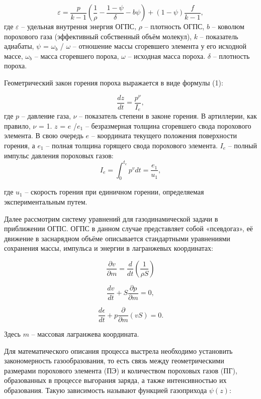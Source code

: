 \documentclass[14pt, a4paper]{report} %
\begin{document}
\begin{equation}
\varepsilon = \frac{p}{k - 1} \left( \frac{1}{\rho} - \frac{1 - \psi}{\delta} - b \psi \right) + (1 - \psi) \frac{f}{k - 1},
\label{eq:epsilon}
\end{equation}
где $\varepsilon$ -- удельная внутрення энергия ОГПС, $\rho$ -- плотность ОГПС, $b$ -- коволюм порохового газа (эффективный собственный объём молекул), $k$ -- показатель адиабаты, 
$\psi$ = $\omega_b$ / $\omega$ -- отношение массы сгоревшего элемента у его исходной массе, $\omega_b$ -- масса сгоревшего пороха, $\omega$ -- исходная масса пороха. $\delta$ -- плотность пороха. 

Геометрический закон горения пороха выражается в виде формулы (1): 

\begin{equation}
\frac{dz}{dt} = \frac{p^\nu}{I_e}, 
\label{eq:1}
\end{equation}
где  $p$ -- давление газа, $\nu$ -- показатель степени
в законе горения. В артиллерии, как правило, $\nu$ = 1. $z$ = $e$ /$e_1$ -- безразмерная толщина сгоревшего свода порохового элемента. В свою очередь
$e$ -- координата текущего положения поверхности горения, а $e_1$ -- полная толщина горящего свода порохового элемента. $I_e$ -- полный импульс давления пороховых газов:
\[
I_e = \int_0^{t_e} p^v  dt = \frac{e_1}{u_1},
\]

где $u_1$ -- скорость горения при единичном горении, определяемая экспериментальным путем.

Далее рассмотрим систему уравнений для газодинамической задачи в приближении ОГПС. ОГПС в данном случае представляет собой «псевдогаз», её движение в заснарядном
объёме описывается стандартными уравнениями сохранения массы, импульса и энергии в лагранжевых координатах: 

\begin{equation}
\frac{\partial v}{\partial m} = \frac{d}{dt}\left(\frac{1}{\rho S}\right)
\end{equation}

\begin{equation}
\frac{dv}{dt} + S\frac{\partial p}{\partial m} = 0,
\end{equation}

\begin{equation}
\frac{d\epsilon}{dt} + p\frac{\partial}{\partial m}(vS) = 0.
\end{equation}

Здесь $m$ -- массовая лагранжева координата.

Для математического описания процесса выстрела необходимо установить закономерность газообразования, то есть связь между геометрическими размерами порохового элемента (ПЭ) и количеством пороховых газов (ПГ), образованных в процессе выгорания заряда, а также интенсивностью их образования. Такую зависимость называют функцией газоприхода $\psi(z)$:
\end{document}
